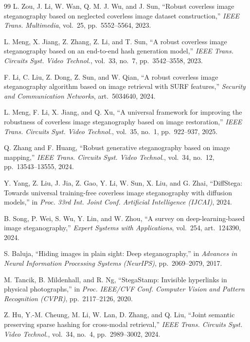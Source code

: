 \documentclass[10pt,a4paper]{article}
\theoremstyle{definition}
\begin{document}
\begin{thebibliography}{99}
L. Zou, J. Li, W. Wan, Q. M. J. Wu, and J. Sun,
``Robust coverless image steganography based on neglected coverless image dataset construction,''
\emph{IEEE Trans. Multimedia}, vol.~25, pp.~5552--5564, 2023.

L. Meng, X. Jiang, Z. Zhang, Z. Li, and T. Sun,
``A robust coverless image steganography based on an end-to-end hash generation model,''
\emph{IEEE Trans. Circuits Syst. Video Technol.}, vol.~33, no.~7, pp.~3542--3558, 2023.

F. Li, C. Liu, Z. Dong, Z. Sun, and W. Qian,
``A robust coverless image steganography algorithm based on image retrieval with SURF features,''
\emph{Security and Communication Networks}, art.~5034640, 2024.

L. Meng, F. Li, X. Jiang, and Q. Xu,
``A universal framework for improving the robustness of coverless image steganography based on image restoration,''
\emph{IEEE Trans. Circuits Syst. Video Technol.}, vol.~35, no.~1, pp.~922--937, 2025.

Q. Zhang and F. Huang,
``Robust generative steganography based on image mapping,''
\emph{IEEE Trans. Circuits Syst. Video Technol.}, vol.~34, no.~12, pp.~13543--13555, 2024.

Y. Yang, Z. Liu, J. Jia, Z. Gao, Y. Li, W. Sun, X. Liu, and G. Zhai,
``DiffStega: Towards universal training-free coverless image steganography with diffusion models,''
in \emph{Proc. 33rd Int. Joint Conf. Artificial Intelligence (IJCAI)}, 2024.

B. Song, P. Wei, S. Wu, Y. Lin, and W. Zhou,
``A survey on deep-learning-based image steganography,''
\emph{Expert Systems with Applications}, vol.~254, art.~124390, 2024.

S. Baluja,
``Hiding images in plain sight: Deep steganography,''
in \emph{Advances in Neural Information Processing Systems (NeurIPS)}, pp.~2069--2079, 2017.

M. Tancik, B. Mildenhall, and R. Ng,
``StegaStamp: Invisible hyperlinks in physical photographs,''
in \emph{Proc. IEEE/CVF Conf. Computer Vision and Pattern Recognition (CVPR)}, pp.~2117--2126, 2020.

Z. Hu, Y.-M. Cheung, M. Li, W. Lan, D. Zhang, and Q. Liu,
``Joint semantic preserving sparse hashing for cross-modal retrieval,''
\emph{IEEE Trans. Circuits Syst. Video Technol.}, vol.~34, no.~4, pp.~2989--3002, 2024.


\end{thebibliography}
\end{document}
